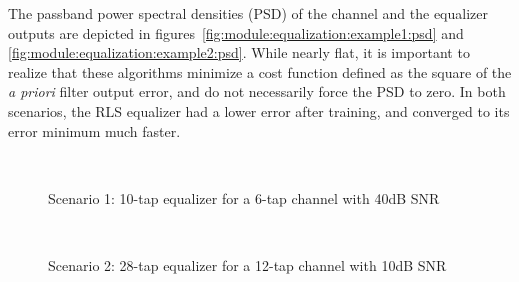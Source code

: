 The passband power spectral densities (PSD) of the channel and the equalizer outputs
are depicted in figures~\ref{fig:module:equalization:example1:psd} and
\ref{fig:module:equalization:example2:psd}.
While nearly flat, it is important to realize that these algorithms minimize
a cost function defined as the square of the {\it a priori} filter output error,
and do not necessarily force the PSD to zero.
In both scenarios, the RLS equalizer had a lower error after training, and converged to its
error minimum much faster.



\begin{figure}[ht]
\centering
\mbox{
   \quad
   \quad
}
\mbox{
   \quad
   \quad
}
\caption{Scenario 1: 10-tap equalizer for a 6-tap channel with 40dB SNR}
\label{fig:module:equalization:example1}
\end{figure}



\begin{figure}[ht]
\centering
\mbox{
   \quad
   \quad
}
\mbox{
   \quad
   \quad
}
\caption{Scenario 2: 28-tap equalizer for a 12-tap channel with 10dB SNR}
\label{fig:module:equalization:example2}
\end{figure}


